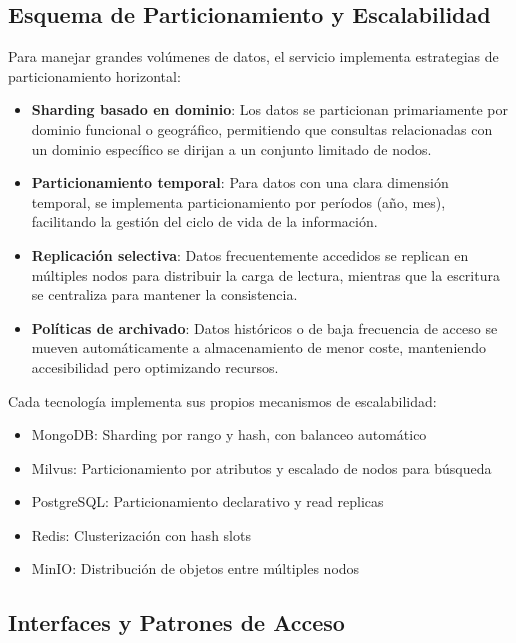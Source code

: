 \documentclass[12pt,a4paper]{article}
\begin{document}
\subsection{Esquema de Particionamiento y Escalabilidad}
\label{subsec:ds-particionamiento}

Para manejar grandes volúmenes de datos, el servicio implementa estrategias de particionamiento horizontal:

\begin{itemize}
    \item \textbf{Sharding basado en dominio}: Los datos se particionan primariamente por dominio funcional o geográfico, permitiendo que consultas relacionadas con un dominio específico se dirijan a un conjunto limitado de nodos.
    
    \item \textbf{Particionamiento temporal}: Para datos con una clara dimensión temporal, se implementa particionamiento por períodos (año, mes), facilitando la gestión del ciclo de vida de la información.
    
    \item \textbf{Replicación selectiva}: Datos frecuentemente accedidos se replican en múltiples nodos para distribuir la carga de lectura, mientras que la escritura se centraliza para mantener la consistencia.
    
    \item \textbf{Políticas de archivado}: Datos históricos o de baja frecuencia de acceso se mueven automáticamente a almacenamiento de menor coste, manteniendo accesibilidad pero optimizando recursos.
\end{itemize}

Cada tecnología implementa sus propios mecanismos de escalabilidad:
\begin{itemize}
    \item MongoDB: Sharding por rango y hash, con balanceo automático
    \item Milvus: Particionamiento por atributos y escalado de nodos para búsqueda
    \item PostgreSQL: Particionamiento declarativo y read replicas
    \item Redis: Clusterización con hash slots
    \item MinIO: Distribución de objetos entre múltiples nodos
\end{itemize}

\subsection{Interfaces y Patrones de Acceso}
\label{subsec:ds-interfaces}
\end{document}
